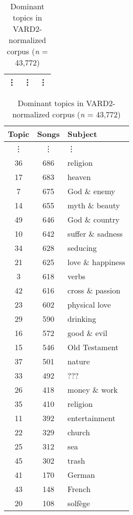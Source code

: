 \begin{table}
\begin{minipage}{0.5\textwidth}
\begin{tabular}{ccl}
			\vdots & \vdots & \vdots \\
			\bottomrule
		\end{tabular}
	\end{minipage}
	\begin{minipage}{0.5\textwidth}
		\begin{tabular}{|ccl}
			\toprule
			Topic & Songs & Subject \\
			\midrule
			\vdots & \vdots & \vdots \\
			36             &             686 & religion \\
			17             &             683 & heaven \\
			7              &             675 & God \& enemy \\
			14             &             655 & myth \& beauty \\
			49             &             646 & God \& country \\
			10             &             642 & suffer \& sadness \\
			34             &             628 & seducing \\
			21             &             625 & love \& happiness \\
			3              &             618 & verbs \\
			42             &             616 & cross \& passion \\
			23             &             602 & physical love \\
			29             &             590 & drinking \\
			16             &             572 & good \& evil \\
			15             &             546 & Old Testament \\
			37             &             501 & nature \\
			33             &             492 & ??? \\
			26             &             418 & money \& work \\
			35             &             410 & religion \\
			11             &             392 & entertainment \\
			22             &             329 & church \\
			25             &             312 & sea \\
			45             &             302 & trash \\
			41             &             170 & German \\
			43             &             148 & French\\
			20             &             108 & solfège\\
			\bottomrule
		\end{tabular}
	\end{minipage}
	\caption{Dominant topics in VARD2-normalized corpus (\textit{n} = 43,772)}
	\label{table:DomTopVARD2extended}
\end{table}

